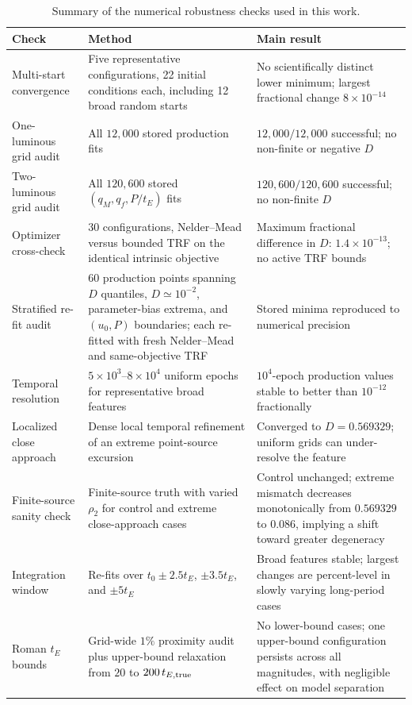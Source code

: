\documentclass{article}
\begin{document}
\begin{table}[t]
\centering
\caption{Summary of the numerical robustness checks used in this work.}
\label{tab:numerical_robustness_summary}
\begin{tabular}{p{}p{}p{}}
\toprule
Check & Method & Main result \\
\midrule
Multi-start convergence & Five representative configurations, 22 initial conditions each, including 12 broad random starts & No scientifically distinct lower minimum; largest fractional change $8\times10^{-14}$ \\
One-luminous grid audit & All $12{,}000$ stored production fits & $12{,}000/12{,}000$ successful; no non-finite or negative $D$ \\
Two-luminous grid audit & All $120{,}600$ stored $(q_M,q_f,P/t_E)$ fits & $120{,}600/120{,}600$ successful; no non-finite $D$ \\
Optimizer cross-check & 30 configurations, Nelder--Mead versus bounded TRF on the identical intrinsic objective & Maximum fractional difference in $D$: $1.4\times10^{-13}$; no active TRF bounds \\
Stratified re-fit audit & 60 production points spanning $D$ quantiles, $D\simeq10^{-2}$, parameter-bias extrema, and $(u_0,P)$ boundaries; each re-fitted with fresh Nelder--Mead and same-objective TRF & Stored minima reproduced to numerical precision \\
Temporal resolution & $5\times10^3$--$8\times10^4$ uniform epochs for representative broad features & $10^4$-epoch production values stable to better than $10^{-12}$ fractionally \\
Localized close approach & Dense local temporal refinement of an extreme point-source excursion & Converged to $D=0.569329$; uniform grids can under-resolve the feature \\
Finite-source sanity check & Finite-source truth with varied $\rho_2$ for control and extreme close-approach cases & Control unchanged; extreme mismatch decreases monotonically from $0.569329$ to $0.086$, implying a shift toward greater degeneracy \\
Integration window & Re-fits over $t_0\pm2.5t_E$, $\pm3.5t_E$, and $\pm5t_E$ & Broad features stable; largest changes are percent-level in slowly varying long-period cases \\
Roman $t_E$ bounds & Grid-wide $1\%$ proximity audit plus upper-bound relaxation from $20$ to $200\,t_{E,\rm true}$ & No lower-bound cases; one upper-bound configuration persists across all magnitudes, with negligible effect on model separation \\
\bottomrule
\end{tabular}
\end{table}
\end{document}
